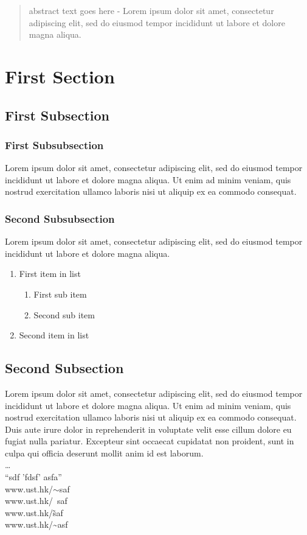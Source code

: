 \documentclass{llncs}
\begin{document}
\iffalse
\begin{abstract}
abstract text goes here - Lorem ipsum dolor sit amet, consectetur adipiscing elit, sed do eiusmod tempor incididunt ut labore et dolore magna aliqua.
\end{abstract}

\section{First Section}

\subsection{First Subsection}
\subsubsection{First Subsubsection}
Lorem ipsum dolor sit amet, consectetur adipiscing elit, sed do eiusmod tempor incididunt ut labore et dolore magna aliqua. Ut enim ad minim veniam, quis nostrud exercitation ullamco laboris nisi ut aliquip ex ea commodo consequat. 

\subsubsection{Second Subsubsection}
Lorem ipsum dolor sit amet, consectetur adipiscing elit, sed do eiusmod tempor incididunt ut labore et dolore magna aliqua.

\begin{enumerate}
\item First item in list
\begin{enumerate}
\item First sub item
\item Second sub item
\end{enumerate}
\item Second item in list
\end{enumerate}

\subsection{Second Subsection}
Lorem ipsum dolor sit amet, consectetur adipiscing elit, sed do eiusmod tempor incididunt ut labore et dolore magna aliqua. Ut enim ad minim veniam, quis nostrud\cite{reference1} exercitation ullamco laboris nisi ut aliquip ex ea commodo consequat. Duis aute irure dolor in reprehenderit in voluptate velit esse cillum dolore eu fugiat nulla pariatur. Excepteur sint occaecat cupidatat non proident, sunt in culpa qui officia deserunt mollit anim id est laborum.\\
\ldots\\ 
``sdf 'fdsf' asfa''\\
www.ust.hk/$\sim$saf\\
www.ust.hk/~saf\\
www.ust.hk/\~saf\\
www.ust.hk/\~{}asf\\
\end{document}
